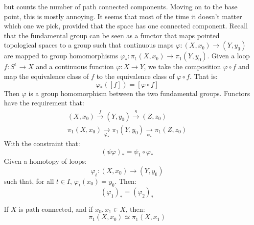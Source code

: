 \documentclass[crop=false,class=book,oneside]{standalone}
\begin{document}
            but counts the number of path connected components.
            Moving on to the base point, this is mostly annoying.
            It seems that most of the time it doesn't matter which
            one we pick, provided that the space has one connected
            component. Recall that the fundamental group can be
            seen as a functor that maps pointed topological
            spaces to a group such that continuous maps
            $\varphi:(X,x_{0})\rightarrow(Y,y_{0})$ are mapped
            to group homomorphisms
            $\varphi_{*}:\pi_{1}(X,x_{0})\rightarrow\pi_{1}(Y,y_{0})$.
            Given a loop $f:S^{1}\rightarrow{X}$ and a continuous
            function $\varphi:X\rightarrow{Y}$, we take the
            composition $\varphi\circ{f}$ and map the equivalence
            class of $f$ to the equivalence class of
            $\varphi\circ{f}$. That is:
            \begin{equation}
                \varphi_{*}([f])=[\varphi\circ{f}]
            \end{equation}
            Then $\varphi$ is a group homomorphism between the
            two fundamental groups. Functors have the requirement
            that:
            \begin{align}
                (X,x_{0})\overset{f}{\longrightarrow}
                (Y,y_{0})\overset{g}{\longrightarrow}
                (Z,z_{0})\\
                \pi_{1}(X,x_{0})
                    \underset{\varphi_{*}}{\longrightarrow}
                \pi_{1}(Y,y_{0})
                    \underset{\psi_{*}}{\longrightarrow}
                \pi_{1}(Z,z_{0})
            \end{align}
            With the constraint that:
            \begin{equation}
                (\psi\varphi)_{*}=\psi_{1}\circ\varphi_{*}
            \end{equation}
            Given a homotopy of loops:
            \begin{equation}
                \varphi_{t}:(X,x_{0})\rightarrow(Y,y_{0})
            \end{equation}
            such that, for all $t\in{I}$, $\varphi_{t}(x_{0})=y_{0}$.
            Then:
            \begin{equation}
                (\varphi_{1})_{*}=(\varphi_{2})_{*}
            \end{equation}
            \begin{theorem}
                If $X$ is path connected, and if $x_{0},x_{1}\in{X}$,
                then:
                \begin{equation}
                    \pi_{1}(X,x_{0})\simeq\pi_{1}(X,x_{1})
                \end{equation}
            \end{theorem}
\end{document}
